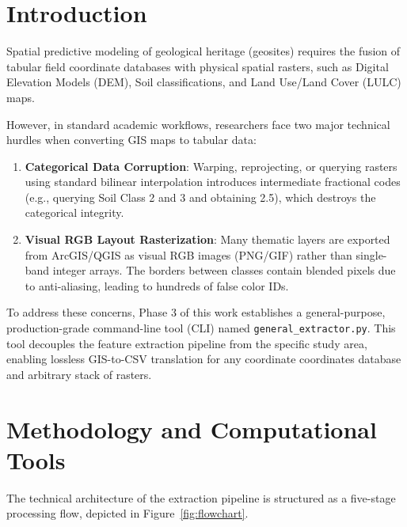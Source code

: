 \documentclass[11pt,twocolumn,a4paper]{article}
\begin{document}
\section{Introduction}
Spatial predictive modeling of geological heritage (geosites) requires the fusion of tabular field coordinate databases with physical spatial rasters, such as Digital Elevation Models (DEM), Soil classifications, and Land Use/Land Cover (LULC) maps. 

However, in standard academic workflows, researchers face two major technical hurdles when converting GIS maps to tabular data:
\begin{enumerate}
    \item \textbf{Categorical Data Corruption}: Warping, reprojecting, or querying rasters using standard bilinear interpolation introduces intermediate fractional codes (e.g., querying Soil Class 2 and 3 and obtaining 2.5), which destroys the categorical integrity.
    \item \textbf{Visual RGB Layout Rasterization}: Many thematic layers are exported from ArcGIS/QGIS as visual RGB images (PNG/GIF) rather than single-band integer arrays. The borders between classes contain blended pixels due to anti-aliasing, leading to hundreds of false color IDs.
\end{enumerate}

To address these concerns, Phase 3 of this work establishes a general-purpose, production-grade command-line tool (CLI) named \texttt{general\_extractor.py}. This tool decouples the feature extraction pipeline from the specific study area, enabling lossless GIS-to-CSV translation for any coordinate coordinates database and arbitrary stack of rasters.

\section{Methodology and Computational Tools}

The technical architecture of the extraction pipeline is structured as a five-stage processing flow, depicted in Figure~\ref{fig:flowchart}.
\end{document}
